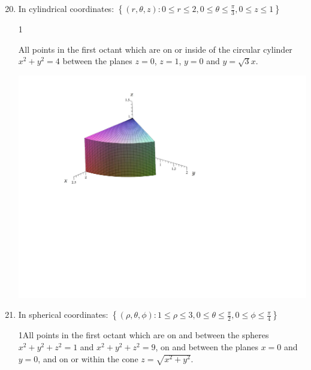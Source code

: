 \documentclass[12pt]{article}
\begin{document}
\begin{enumerate}
\setcounter{enumi}{19}

\item In cylindrical coordinates: $\left\{(r,\theta,z): 0 \leq r \leq 2, 0 \leq \theta \leq \frac{\pi}{3}, 0 \leq z \leq 1\right\}$

{{1\linewidth}{All points in the first octant which are on or inside of the circular cylinder $x^2+y^2=4$ between the planes $z=0$, $z=1$, $y=0$ and $y=\sqrt{3}x$.
\begin{center}
\includegraphics[scale=0.4]{describe1.pdf}
\end{center}}}

\item In spherical coordinates: $\left\{(\rho,\theta,\phi): 1 \leq \rho \leq 3, 0 \leq \theta \leq \frac{\pi}{2}, 0 \leq \phi \leq \frac{\pi}{4}\right\}$

{{1\linewidth}{All points in the first octant which are on and between the spheres $x^2+y^2+z^2=1$ and $x^2+y^2+z^2=9$, on and between the planes $x=0$ and $y=0$, and on or within the cone $z=\sqrt{x^2+y^2}$.}}

\end{enumerate}
\end{document}
